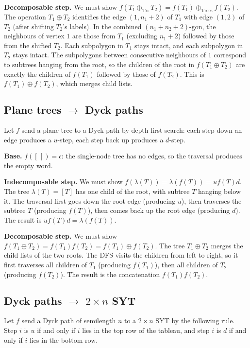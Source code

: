 \documentclass[a4paper,11pt]{article}
\theoremstyle{definition}
\begin{document}
\textbf{Decomposable step.}
We must show
$f(T_1 \oplus_{\text{Tri}} T_2)
= f(T_1) \oplus_{\text{Trees}} f(T_2)$.
The operation $T_1 \oplus T_2$ identifies the edge
$(1, n_1{+}2)$ of $T_1$ with edge $(1,2)$ of $T_2$
(after shifting $T_2$'s labels). In the combined
$(n_1{+}n_2{+}2)$-gon, the neighbours of vertex $1$ are
those from $T_1$ (excluding $n_1{+}2$) followed by those
from the shifted $T_2$. Each subpolygon in
$T_1$ stays intact, and each subpolygon in $T_2$ stays
intact. The subpolygons between consecutive neighbours of $1$
correspond to subtrees hanging from the root, so the
children of the root in $f(T_1 \oplus T_2)$ are exactly
the children of $f(T_1)$ followed by those of $f(T_2)$.
This is $f(T_1) \oplus f(T_2)$, which merges child lists.

\subsection{Plane trees $\to$ Dyck paths}\label{sec:bij-trees-dyck}

Let $f$ send a plane tree to a Dyck path by depth-first
search: each step down an edge produces a $u$-step, each
step back up produces a $d$-step.

\textbf{Base.}
$f([\,]) = \epsilon$: the single-node tree has no edges,
so the traversal produces the empty word.

\textbf{Indecomposable step.}
We must show
$f(\lambda(T)) = \lambda(f(T)) = u f(T) d$.
The tree $\lambda(T) = [T]$ has one child of the root,
with subtree $T$ hanging below it. The traversal first
goes down the root edge (producing $u$), then traverses
the subtree $T$ (producing $f(T)$), then comes back up
the root edge (producing $d$). The result is
$u f(T) d = \lambda(f(T))$.

\textbf{Decomposable step.}
We must show
$f(T_1 \oplus T_2)
= f(T_1) f(T_2) = f(T_1) \oplus f(T_2)$.
The tree $T_1 \oplus T_2$ merges the child lists of the
two roots. The DFS visits the children from left to
right, so it first traverses all children of $T_1$
(producing $f(T_1)$), then all children of $T_2$
(producing $f(T_2)$). The result is the concatenation
$f(T_1) f(T_2)$.

\subsection{Dyck paths $\to$ $2 \times n$ SYT}\label{sec:bij-dyck-syt}

Let $f$ send a Dyck path of semilength $n$ to a
$2 \times n$ SYT by the following rule. Step $i$ is $u$ if and
only if $i$ lies in the top row of the tableau, and
step $i$ is $d$ if and only if $i$ lies in the bottom
row.
\end{document}
